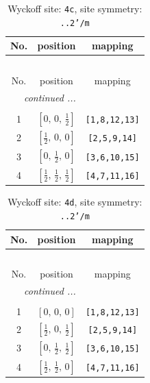 \documentclass[fleqn,8pt]{jsarticle}
\begin{document}
\renewcommand{\arraystretch}{1.2}
\begin{longtable}{ccc}
\caption{Wyckoff site: {\tt 4c}, site symmetry: {\tt ..2'/m}}
 \\
 \hline \hline
No. & position & mapping \\ \hline \endfirsthead

\multicolumn{2}{l}{\tablename\ \thetable{}} \\
 \hline \hline
No. & position & mapping \\ \hline \endhead

 \hline \hline
\multicolumn{2}{r}{\footnotesize\it continued ...} \\ \endfoot

 \hline \hline
\multicolumn{2}{r}{} \\ \endlastfoot

1 & $\left[ 0,\, 0,\, \frac{1}{2} \right]$ & {\tt [1,8,12,13]} \\ \hline
2 & $\left[ \frac{1}{2},\, 0,\, 0 \right]$ & {\tt [2,5,9,14]} \\ \hline
3 & $\left[ 0,\, \frac{1}{2},\, 0 \right]$ & {\tt [3,6,10,15]} \\ \hline
4 & $\left[ \frac{1}{2},\, \frac{1}{2},\, \frac{1}{2} \right]$ & {\tt [4,7,11,16]} \\
\end{longtable}
\renewcommand{\arraystretch}{1.2}
\begin{longtable}{ccc}
\caption{Wyckoff site: {\tt 4d}, site symmetry: {\tt ..2'/m}}
 \\
 \hline \hline
No. & position & mapping \\ \hline \endfirsthead

\multicolumn{2}{l}{\tablename\ \thetable{}} \\
 \hline \hline
No. & position & mapping \\ \hline \endhead

 \hline \hline
\multicolumn{2}{r}{\footnotesize\it continued ...} \\ \endfoot

 \hline \hline
\multicolumn{2}{r}{} \\ \endlastfoot

1 & $\left[ 0,\, 0,\, 0 \right]$ & {\tt [1,8,12,13]} \\ \hline
2 & $\left[ \frac{1}{2},\, 0,\, \frac{1}{2} \right]$ & {\tt [2,5,9,14]} \\ \hline
3 & $\left[ 0,\, \frac{1}{2},\, \frac{1}{2} \right]$ & {\tt [3,6,10,15]} \\ \hline
4 & $\left[ \frac{1}{2},\, \frac{1}{2},\, 0 \right]$ & {\tt [4,7,11,16]} \\
\end{longtable}
\end{document}

